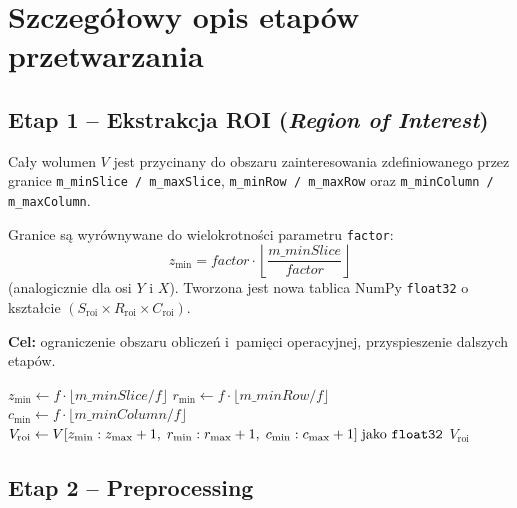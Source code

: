 \documentclass[12pt,a4paper]{article}
\begin{document}
\bigskip

\section{Szczegółowy opis etapów przetwarzania}
\label{sec:stages}

\subsection{Etap 1 -- Ekstrakcja ROI (\textit{Region of Interest})}
\label{sec:roi}

Cały wolumen $V$ jest przycinany do obszaru zainteresowania zdefiniowanego przez
granice \texttt{m\_minSlice / m\_maxSlice}, \texttt{m\_minRow / m\_maxRow} oraz
\texttt{m\_minColumn / m\_maxColumn}.

Granice są wyrównywane do wielokrotności parametru \texttt{factor}:
\[
  z_{\min} = \textit{factor} \cdot \left\lfloor \frac{m\_minSlice}{\textit{factor}} \right\rfloor
\]
(analogicznie dla osi $Y$ i $X$). Tworzona jest nowa tablica NumPy
\texttt{float32} o kształcie $(S_{\text{roi}} \times R_{\text{roi}} \times C_{\text{roi}})$.

\textbf{Cel:} ograniczenie obszaru obliczeń i~pamięci operacyjnej, przyspieszenie
dalszych etapów.

\begin{algorithm}[H]
\caption{\textsc{ExtractROI} -- ekstrakcja obszaru zainteresowania}
\label{alg:roi}
\BlankLine
$z_{\min} \leftarrow f \cdot \lfloor m\_minSlice / f \rfloor$\;
$r_{\min} \leftarrow f \cdot \lfloor m\_minRow    / f \rfloor$\;
$c_{\min} \leftarrow f \cdot \lfloor m\_minColumn / f \rfloor$\;
$V_{\text{roi}} \leftarrow V[z_{\min}:z_{\max}+1,\; r_{\min}:r_{\max}+1,\; c_{\min}:c_{\max}+1]
  \;\text{jako \texttt{float32}}$\;
\Return $V_{\text{roi}}$\;
\end{algorithm}

\subsection{Etap 2 -- Preprocessing}
\label{sec:preproc}
\end{document}
